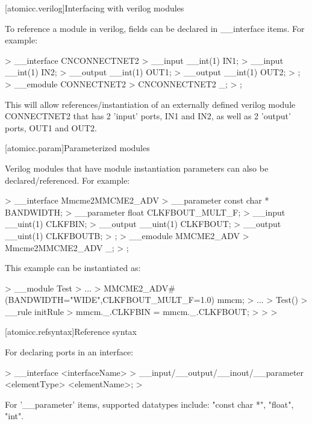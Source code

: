 [atomicc.verilog]{Interfacing with verilog modules}

To reference a module in verilog, fields can be declared in __interface items.
For example:

\begin{codeblock}
>        __interface CNCONNECTNET2 {
>            __input  __int(1)         IN1;
>            __input  __int(1)         IN2;
>            __output __int(1)         OUT1;
>            __output __int(1)         OUT2;
>        };
>        __emodule CONNECTNET2 {
>            CNCONNECTNET2 _;
>        };
\end{codeblock}

This will allow references/instantiation of an externally defined verilog module CONNECTNET2
that has 2 'input' ports, IN1 and IN2, as well as 2 'output' ports, OUT1 and OUT2.

[atomicc.param]{Parameterized modules}

Verilog modules that have module instantiation parameters can also be declared/referenced.
For example:

\begin{codeblock}
>        __interface Mmcme2MMCME2_ADV {
>            __parameter const char *  BANDWIDTH;
>            __parameter float         CLKFBOUT_MULT_F;
>            __input  __uint(1)        CLKFBIN;
>            __output __uint(1)        CLKFBOUT;
>            __output __uint(1)        CLKFBOUTB;
>        };
>        __emodule MMCME2_ADV {
>            Mmcme2MMCME2_ADV _;
>        };
\end{codeblock}

This example can be instantiated as:

\begin{codeblock}
>        __module Test {
>            ...
>            MMCME2_ADV#(BANDWIDTH="WIDE",CLKFBOUT_MULT_F=1.0) mmcm;
>            ...
>            Test() {
>               __rule initRule {
>                   mmcm._.CLKFBIN = mmcm._.CLKFBOUT;
>               }
>            }
>        }
\end{codeblock}

[atomicc.refsyntax]{Reference syntax}

For declaring ports in an interface:
\begin{codeblock}
>        __interface <interfaceName> {
>             __input/__output/__inout/__parameter <elementType> <elementName>;
>        }
\end{codeblock}
For '__parameter' items, supported datatypes include: "const char *", "float", "int".

